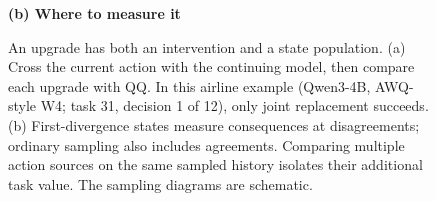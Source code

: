 \begin{figure}[t]
\begin{minipage}[t]{.49\textwidth}
\begin{tikzpicture}
\end{tikzpicture}
\end{minipage}\hfill
\begin{minipage}[t]{.48\textwidth}
\centering
\textbf{(b) Where to measure it}\par\smallskip

\end{minipage}
\caption{An upgrade has both an intervention and a state population. (a) Cross the current action with the continuing model, then compare each upgrade with QQ. In this airline example (Qwen3-4B, AWQ-style W4; task 31, decision 1 of 12), only joint replacement succeeds. (b) First-divergence states measure consequences at disagreements; ordinary sampling also includes agreements. Comparing multiple action sources on the same sampled history isolates their additional task value. The sampling diagrams are schematic.} %
\label{fig:case}
\label{fig:fork}
\label{fig:method}
\end{figure}


